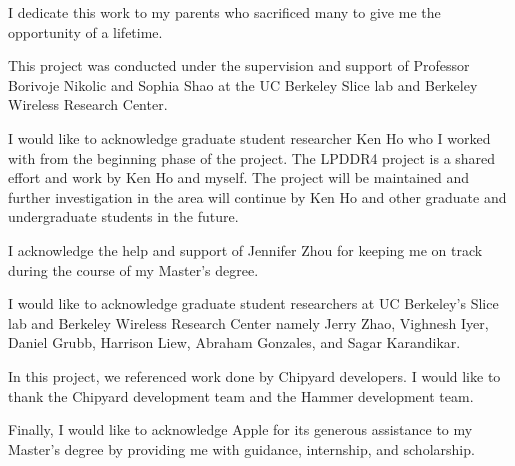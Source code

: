 \documentclass[masters]{ucbthesis}
\begin{document}
\begin{frontmatter}

\begin{dedication}
\null\vfil
\begin{center}
I dedicate this work to my parents who sacrificed many to give me the opportunity of a lifetime. 
\end{center}
\vfil\null
\end{dedication}


\tableofcontents
\clearpage
\listoffigures
\clearpage
\listoftables

\begin{acknowledgements}

This project was conducted under the supervision and support of Professor Borivoje Nikolic and Sophia Shao at the UC Berkeley Slice lab and Berkeley Wireless Research Center.

I would like to acknowledge graduate student researcher Ken Ho who I worked with from the beginning phase of the project. The LPDDR4 project is a shared effort and work by Ken Ho and myself. The project will be maintained and further investigation in the area will continue by Ken Ho and other graduate and undergraduate students in the future. 

I acknowledge the help and support of Jennifer Zhou for keeping me on track during the course of my Master's degree.


I would like to acknowledge graduate student researchers at UC Berkeley's Slice lab and Berkeley Wireless Research Center namely Jerry Zhao, Vighnesh Iyer, Daniel Grubb, Harrison Liew, Abraham Gonzales, and Sagar Karandikar.

In this project, we referenced work done by Chipyard developers. I would like to thank the Chipyard development team and the Hammer development team.

Finally, I would like to acknowledge Apple for its generous assistance to my Master's degree by providing me with guidance, internship, and scholarship. 
\end{acknowledgements}

\end{frontmatter}

\pagestyle{headings}








\printbibliography
\end{document}

